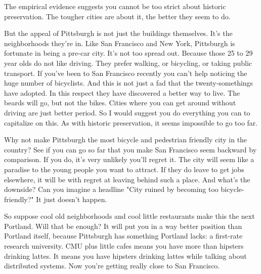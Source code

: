 The empirical evidence
                  suggests you cannot be too strict about historic preservation.
                  The tougher cities are about it, the better they seem to
                  do.

But the appeal of Pittsburgh is not just the
                  buildings themselves. It's the neighborhoods they're in. Like
                  San Francisco and New York, Pittsburgh is fortunate in being a
                  pre-car city. It's not too spread out. Because those 25 to 29
                  year olds do not like driving. They prefer walking, or
                  bicycling, or taking public transport. If you've been to San
                  Francisco recently you can't help noticing the huge number of
                  bicyclists. And this is not just a fad that the
                  twenty-somethings have adopted. In this respect they have
                  discovered a better way to live. The beards will go, but not
                  the bikes. Cities where you can get around without driving are
                  just better period. So I would suggest you do everything you
                  can to capitalize on this. As with historic preservation, it
                  seems impossible to go too far.

Why not make
                  Pittsburgh the most bicycle and pedestrian friendly city in
                  the country? See if you can go so far that you make San
                  Francisco seem backward by comparison. If you do, it's very
                  unlikely you'll regret it. The city will seem like a paradise
                  to the young people you want to attract. If they do leave to
                  get jobs elsewhere, it will be with regret at leaving behind
                  such a place. And what's the downside? Can you imagine a
                  headline "City ruined by becoming too bicycle-friendly?" It
                  just doesn't happen.

So suppose cool old
                  neighborhoods and cool little restaurants make this the next
                  Portland. Will that be enough? It will put you in a way better
                  position than Portland itself, because Pittsburgh has
                  something Portland lacks: a first-rate research university.
                  CMU plus little cafes means you have more than hipsters
                  drinking lattes. It means you have hipsters drinking lattes
                  while talking about distributed systems. Now you're getting
                  really close to San Francisco.

